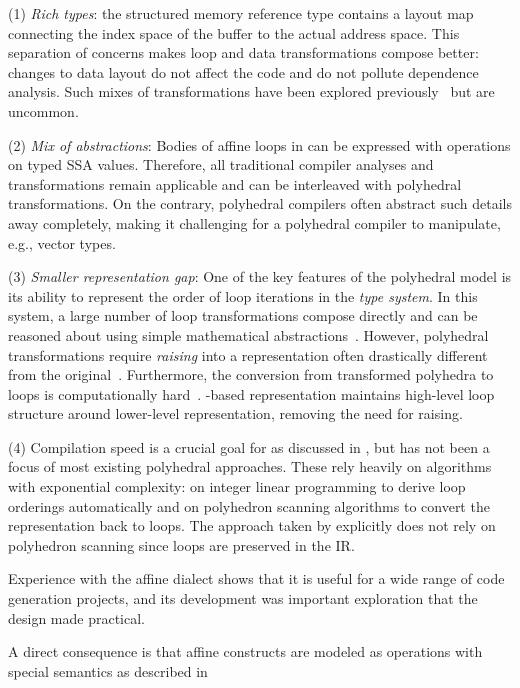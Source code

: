 (1) \emph{Rich types}: the \MLIR structured memory reference type contains a layout
map connecting the index space of the buffer to the actual address space.
This separation of concerns makes loop and data transformations compose better:
changes to data layout do not affect the code and do not pollute dependence
analysis. Such mixes of transformations have been explored
previously~\cite{chandan} but are uncommon.

(2) \emph{Mix of abstractions}: Bodies of affine loops in \MLIR can be expressed with
operations on typed SSA values.
Therefore, all traditional compiler analyses and transformations
remain applicable and can be interleaved with polyhedral transformations.  On
the contrary, polyhedral compilers often abstract such details away completely,
making it challenging for a polyhedral compiler to manipulate, e.g., vector
types.

(3) \emph{Smaller representation gap}: One of the key features of the polyhedral
model is its ability to represent the
order of loop iterations in the \emph{type system}. In this system, a large
number of loop transformations compose directly and can be reasoned about using
simple mathematical abstractions~\cite{uruk}. However, polyhedral
transformations require \emph{raising} into a representation often
drastically different from the original~\cite{polly,pollytactics}. Furthermore,
the conversion from
transformed polyhedra to loops is computationally hard~\cite{cloog}.
\MLIR-based representation maintains high-level loop structure around
lower-level representation, removing the need for raising.

(4) Compilation speed is a crucial goal for \MLIR as discussed in
, but has not been a focus of most existing polyhedral
approaches.  These rely heavily on algorithms with exponential complexity: on integer
linear programming to derive loop orderings automatically and on polyhedron
scanning algorithms to convert the representation back to loops.
The approach taken by \MLIR explicitly does not rely on polyhedron scanning
since loops are preserved in the IR.

Experience with the affine dialect shows that it is useful for a wide range
of code generation projects, and its development was important exploration
that the \MLIR design made practical.

\iffalse
 A direct
consequence is that affine constructs are modeled as operations with special
semantics as described in 

